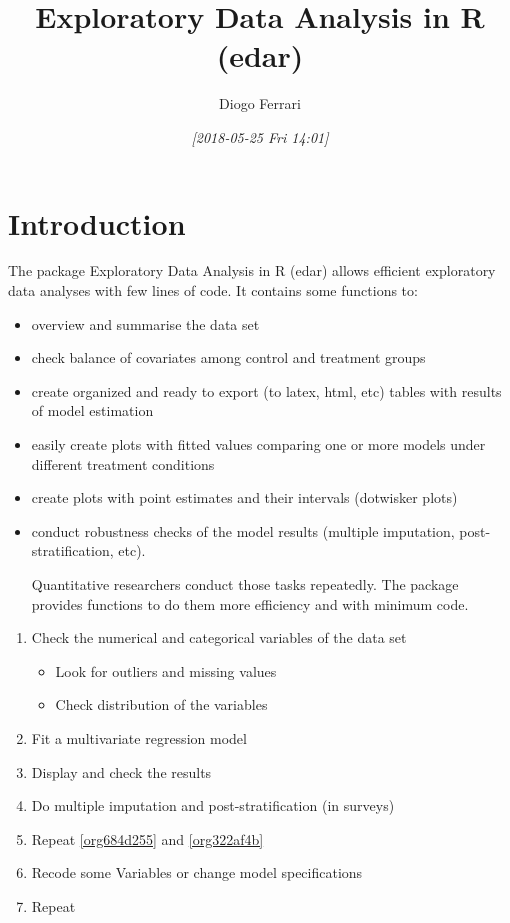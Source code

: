 \documentclass[a4paper]{article}
\author{Diogo Ferrari}
\date{\textit{[2018-05-25 Fri 14:01]}}
\title{Exploratory Data Analysis in R (edar)}
\begin{document}
\maketitle
\tableofcontents


\section{Introduction}
\label{sec:org6b8b7f2}

The package Exploratory Data Analysis in R (edar) allows efficient exploratory data analyses with few lines of code. It contains some functions to:
\begin{itemize}
\item overview and summarise the data set
\item check balance of covariates among control and treatment groups
\item create organized and ready to export (to latex, html, etc) tables with results of model estimation
\item easily create plots with fitted values comparing one or more models under different treatment conditions
\item create plots with point estimates and their intervals (dotwisker plots)
\item conduct robustness checks of the model results (multiple imputation, post-stratification, etc). 

Quantitative researchers conduct those tasks repeatedly. The package provides functions to do them more efficiency and with minimum code.
\end{itemize}


\begin{enumerate}
\item Check the numerical and categorical variables of the data set
\begin{itemize}
\item Look for outliers and missing values
\item Check distribution of the variables
\end{itemize}
\item \label{org684d255} Fit a multivariate regression model
\item \label{org322af4b} Display and check the results
\item Do multiple imputation and post-stratification (in surveys)
\item Repeat \ref{org684d255} and \ref{org322af4b}
\item \label{org07efcb7} Recode some Variables or change model specifications
\item Repeat
\end{enumerate}
\end{document}
